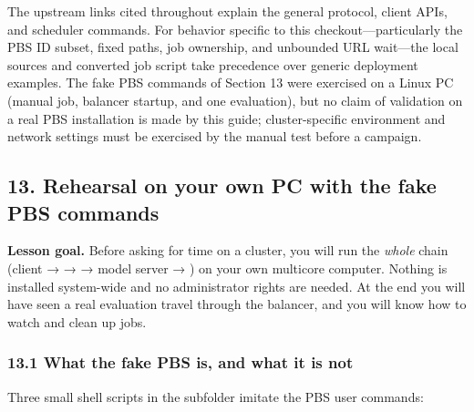 \documentclass[
  11pt,
  a4paper,
]{article}
\DeclareRobustCommand{\InlineCode}[1]{{\ttfamily\upshape\seqsplit{#1}}}
\begin{document}
The upstream links cited throughout explain the general protocol, client
APIs, and scheduler commands. For behavior specific to this
checkout---particularly the PBS ID subset, fixed paths, job ownership,
and unbounded URL wait---the local sources and converted job script take
precedence over generic deployment examples. The fake PBS commands of
Section 13 were exercised on a Linux PC (manual job, balancer startup,
and one evaluation), but no claim of validation on a real PBS
installation is made by this guide; cluster-specific environment and
network settings must be exercised by the manual test before a campaign.

\hypertarget{rehearsal-on-your-own-pc-with-the-fake-pbs-commands}{%
\subsection{13. Rehearsal on your own PC with the fake PBS
commands}\label{rehearsal-on-your-own-pc-with-the-fake-pbs-commands}}

\textbf{Lesson goal.} Before asking for time on a cluster, you will run
the \emph{whole} chain (client → \InlineCode{LoadBalancer} →
\InlineCode{qsub} → model server → \InlineCode{qdel}) on your own
multicore computer. Nothing is installed system-wide and no
administrator rights are needed. At the end you will have seen a real
evaluation travel through the balancer, and you will know how to watch
and clean up jobs.

\hypertarget{what-the-fake-pbs-is-and-what-it-is-not}{%
\subsubsection{13.1 What the fake PBS is, and what it is
not}\label{what-the-fake-pbs-is-and-what-it-is-not}}

Three small shell scripts in the subfolder \InlineCode{bin/} imitate the
PBS user commands:
\end{document}
